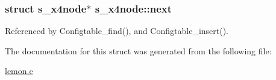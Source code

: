 \hypertarget{structs__x4node_a0d737ff9b01f81956ae193b770112c30}{
\subsubsection[{next}]{\setlength{\rightskip}{0pt plus 5cm}struct {\bf s\-\_\-x4node}$\ast$ s\-\_\-x4node\-::next}}\label{structs__x4node_a0d737ff9b01f81956ae193b770112c30}


Referenced by Configtable\-\_\-find(), and Configtable\-\_\-insert().



The documentation for this struct was generated from the following file\-:\begin{DoxyCompactItemize}
\item 
\hyperlink{lemon_8c}{lemon.\-c}\end{DoxyCompactItemize}
